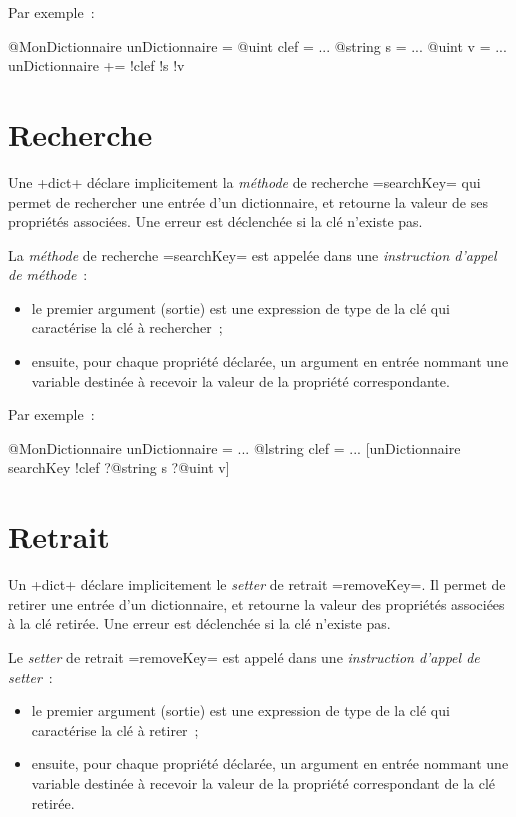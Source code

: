 Par exemple~:
\begin{galgas}
@MonDictionnaire unDictionnaire = {}
@uint clef = ...
@string s = ...
@uint v = ...
unDictionnaire += !clef !s !v
\end{galgas}











\section{Recherche}

Une \ggs+dict+ déclare implicitement la \emph{méthode} de recherche \ggs=searchKey= qui permet de rechercher une entrée d'un dictionnaire, et retourne la valeur de ses propriétés associées. Une erreur est déclenchée si la clé n'existe pas.

La \emph{méthode} de recherche \ggs=searchKey= est appelée dans une \emph{instruction d'appel de méthode}~:
\begin{itemize}
  \item le premier argument (sortie) est une expression de type de la clé qui caractérise la clé à rechercher~;
  \item ensuite, pour chaque propriété déclarée, un argument en entrée nommant une variable destinée à recevoir la valeur de la propriété correspondante.
\end{itemize}


Par exemple~:
\begin{galgas}
@MonDictionnaire unDictionnaire = {}
...
@lstring clef = ...
[unDictionnaire searchKey !clef ?@string s ?@uint v]
\end{galgas}








\section{Retrait}

Un \ggs+dict+ déclare implicitement le \emph{setter} de retrait \ggs=removeKey=. Il permet de retirer une entrée d'un dictionnaire, et retourne la valeur des propriétés associées à la clé retirée. Une erreur est déclenchée si la clé n'existe pas.



Le \emph{setter} de retrait \ggs=removeKey= est appelé dans une \emph{instruction d'appel de setter}~:
\begin{itemize}
  \item le premier argument (sortie) est une expression de type de la clé qui caractérise la clé à retirer~;
  \item ensuite, pour chaque propriété déclarée, un argument en entrée nommant une variable destinée à recevoir la valeur de la propriété correspondant de la clé retirée.
\end{itemize}

